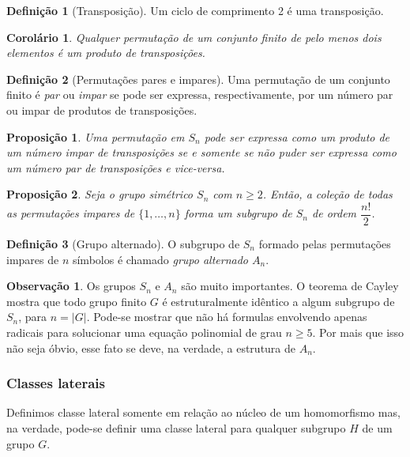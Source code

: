 \documentclass[a4paper,12pt]{report}
\theoremstyle{plain}
\newtheorem{proposicao}{Proposição}[section]
\newtheorem{corolario}{Corolário}[section]
\theoremstyle{definition}
\newtheorem{definicao}{Definição}[section]
\newtheorem{observacao}{Observação}[section]
\begin{document}
	\begin{definicao}[Transposição]
		Um ciclo de comprimento 2 é uma transposição.
	\end{definicao}
	
	\begin{corolario}
		Qualquer permutação de um conjunto finito de pelo menos dois elementos é um produto de transposições.	
	\end{corolario}
	
	\begin{definicao}[Permutações pares e impares]
		Uma permutação de um conjunto finito é \emph{par} ou \emph{impar} se pode ser expressa, respectivamente, por um número par ou impar de produtos de transposições.
	\end{definicao}
	
	\begin{proposicao}
		Uma permutação em $S_n$ pode ser expressa como um produto de um número impar de transposições se e somente se não puder ser expressa como um número par de transposições e vice-versa.
	\end{proposicao}
	
	\begin{proposicao}
		Seja o grupo simétrico $S_n$ com $n\geq 2$. Então, a coleção de todas as permutações impares de $\{1,\dots,n\}$ forma um subgrupo de $S_n$ de ordem $\dfrac{n!}{2}$.	
	\end{proposicao}
	
	\begin{definicao}[Grupo alternado]
		O subgrupo de $S_n$ formado pelas permutações impares de $n$ símbolos é chamado \emph{grupo alternado $A_n$}.
	\end{definicao}
	
	\begin{observacao}
		Os grupos $S_n$ e $A_n$ são muito importantes. O teorema de Cayley mostra que todo grupo finito $G$ é estruturalmente idêntico a algum subgrupo de $S_n$, para $n = |G|$. Pode-se mostrar que não há formulas envolvendo apenas radicais para solucionar uma equação polinomial de grau $n\geq 5$. Por mais que isso não seja óbvio, esse fato se deve, na verdade, a estrutura de $A_n$.
	\end{observacao}
	
	
	\subsubsection{Classes laterais}
	
	Definimos classe lateral somente em relação ao núcleo de um homomorfismo mas,
	na verdade, pode-se definir uma classe lateral para qualquer subgrupo \(H\) de
	um grupo \(G\).
	
\end{document}
